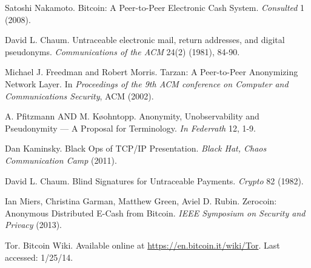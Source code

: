 \documentclass[conference]{IEEEtran}
\begin{document}
\begin{thebibliography}{1}

 Satoshi Nakamoto. Bitcoin: A Peer-to-Peer Electronic Cash System. \emph{Consulted} 1 (2008).

 David L. Chaum. Untraceable electronic mail, return addresses, and digital pseudonyms. \emph{Communications of the ACM} 24(2) (1981), 84-90.

 Michael J. Freedman and Robert Morris. Tarzan: A Peer-to-Peer Anonymizing Network Layer. In \emph{Proceedings of the 9th ACM conference on Computer and Communications Security}, ACM (2002).

 A. Pfitzmann AND M. K\o{o}hntopp. Anonymity, Unobservability and Pseudonymity — A Proposal for Terminology. \emph{In Federrath} 12, 1-9.

 Dan Kaminsky. Black Ops of TCP/IP Presentation. \emph{Black Hat, Chaos Communication Camp} (2011).

 David L. Chaum. Blind Signatures for Untraceable Payments. \emph{Crypto} 82 (1982).

 Ian Miers, Christina Garman, Matthew Green, Aviel D. Rubin. Zerocoin: Anonymous Distributed E-Cash from Bitcoin. \emph{IEEE Symposium on Security and Privacy} (2013).

 Tor. Bitcoin Wiki. Available online at \url{https://en.bitcoin.it/wiki/Tor}. Last accessed: 1/25/14.







\end{thebibliography}
\end{document}
